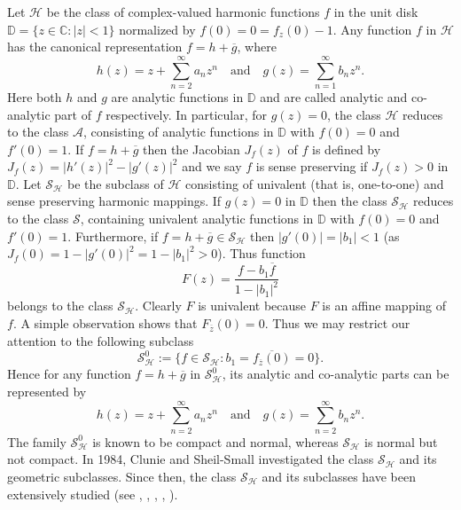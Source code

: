 \documentclass[a4paper,12pt]{amsart}
\theoremstyle{plain}
\theoremstyle{definition}
\newcounter {own}
\begin{document}
Let $\mathcal{H}$ be the class of complex-valued harmonic functions $f$ in the unit disk $\mathbb{D} = \{z\in \mathbb{C}:|z| < 1\}$ normalized by $f(0) = 0 = f_z(0) - 1$. Any function $f$ in $\mathcal{H}$ has the canonical representation $f = h + \overline{g}$, where
\begin{equation}\label{niru-p2-e001}
h(z) = z + \sum_{n = 2}^{\infty}a_n z^n \quad \mbox{and} \quad g(z) = \sum_{n = 1}^{\infty}b_n z^n.
\end{equation}
Here both $h$ and $g$ are  analytic functions in  $\mathbb{D}$ and are called analytic and co-analytic part of $f$ respectively. In particular, for $g(z) = 0$, the class $\mathcal{H}$  reduces to the class $\mathcal{A}$,  consisting of analytic functions in $\mathbb{D}$ with $f(0)= 0$ and $f'(0) = 1$. If $f = h + \overline{g}$ then the Jacobian $J_f(z)$ of $f$ is defined by $ J_f(z) = |h'(z)|^2 - |g'(z)|^2$ and we say $f$ is sense preserving  if $J_f(z) > 0$ in $\mathbb{D}$. Let $\mathcal{S_H}$ be the subclass of $\mathcal{H}$ consisting of univalent (that is, one-to-one) and sense preserving harmonic mappings. If $g(z) = 0$ in $\mathbb{D}$  then the class $\mathcal{S_H}$  reduces to the class $\mathcal{S}$, containing univalent analytic functions in $\mathbb{D}$ with $f(0)= 0$ and $f'(0) = 1$. Furthermore, if $f = h + \overline{g} \in \mathcal{S_H}$ then $|g'(0)| =|b_1|<1$ (as $J_f(0) = 1 - |g'(0)|^2 =1 - |b_1|^2 >0$). Thus  function
$$
F(z) = \frac{f - b_1\overline{f}}{1 - |b_1|^2}
$$
belongs to the class $\mathcal{S_H}$. Clearly $F$ is univalent  because $F$ is an affine mapping of $f$.
A simple observation shows that $F_{\overline{z}}(0) = 0$.
Thus we may  restrict our attention to the following subclass
$$
\mathcal{S}^0_{\mathcal{H}} := \{ f\in \mathcal{S_H} : b_1 = \overline{f_{\overline{z}}(0)} = 0 \}.
$$
Hence for any function $f = h + \overline{g} $ in $\mathcal{S}^0_{\mathcal{H}}$, its analytic and co-analytic parts can be represented by
\begin{equation}\label{niru-p2-e001a}
h(z) = z + \sum_{n = 2}^{\infty}a_n z^n \quad \mbox{and} \quad g(z) = \sum_{n = 2}^{\infty}b_n z^n.
\end{equation}
The family $\mathcal{S}^0_{\mathcal{H}}$ is known to be compact and normal, whereas $\mathcal{S_H}$ is normal but not compact. In 1984, Clunie and Sheil-Small \cite{Clunie-1984} 
investigated the class $\mathcal{S_H}$ and its geometric subclasses. Since then, the class $\mathcal{S_H}$ and its subclasses have been extensively studied
(see \cite{Bshouty-Lyzzaik-2011}, \cite{Bshouty-Joshi-2013}, \cite{Clunie-1984}, \cite{Kalaj-Ponnusamy-Matti-2014}, \cite{Wang-Liang-2001}).
\end{document}
